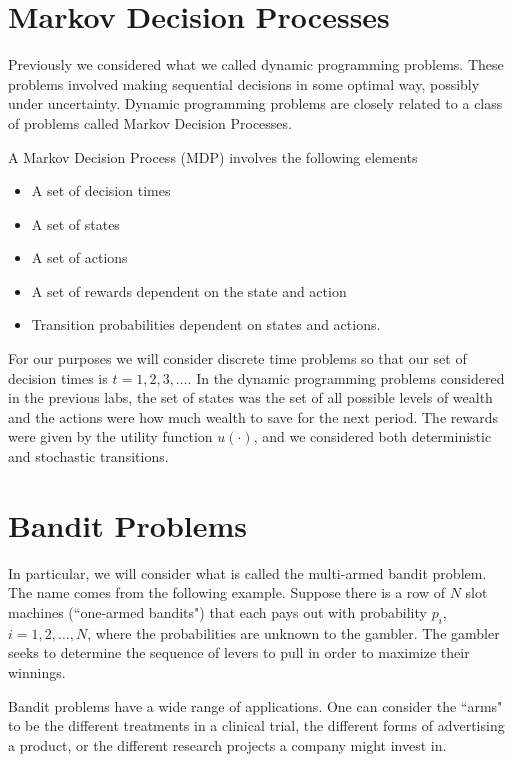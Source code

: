 
\section*{Markov Decision Processes}
Previously we considered what we called dynamic programming problems.  
These problems involved making sequential decisions in some optimal way, 
possibly under uncertainty.  Dynamic programming problems are closely 
related to a class of problems called Markov Decision Processes.

A Markov Decision Process (MDP) involves the following elements

\begin{itemize}
\item   A set of decision times
\item   A set of states
\item   A set of actions
\item   A set of rewards dependent on the state and action
\item   Transition probabilities dependent on states and actions.
\end{itemize}
For our purposes we will consider discrete time problems so that our 
set of decision times is $t = 1,2,3,\ldots$.  
In the dynamic programming problems considered in the previous labs, 
the set of states was the set of all possible levels of wealth and 
the actions were how much wealth to save for the next period.  
The rewards were given by the utility function $u(\cdot)$, 
and we considered both deterministic and stochastic transitions.

\section*{Bandit Problems}
In particular, we will consider what is called the multi-armed bandit 
problem.  The name comes from the following example.  
Suppose there is a row of $N$ slot machines (``one-armed bandits") 
that each pays out with probability $p_i$, $i= 1,2,\ldots,N$, 
where the probabilities are unknown to the gambler.  
The gambler seeks to determine the sequence of levers to pull in 
order to maximize their winnings.

Bandit problems have a wide range of applications.  
One can consider the ``arms" to be the different treatments in a 
clinical trial, the different forms of advertising a product, 
or the different research projects a company might invest in.

